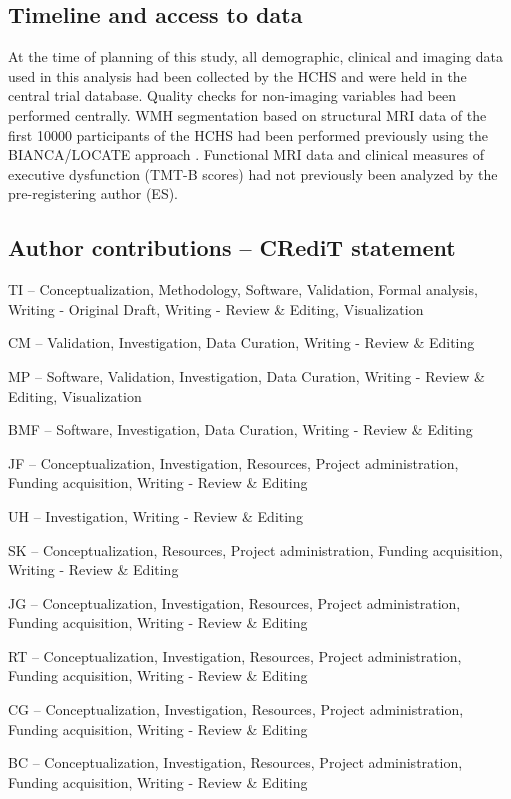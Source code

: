 \subsection{Timeline and access to data}
At the time of planning of this study, all demographic, clinical and imaging data used in this analysis had been collected by the HCHS and were held in the central trial database.
Quality checks for non-imaging variables had been performed centrally.
WMH segmentation based on structural MRI data of the first \num{10000} participants of the HCHS had been performed previously using the BIANCA/LOCATE approach \citep{Rimmele2022-bz}.
Functional MRI data and clinical measures of executive dysfunction (TMT-B scores) had not previously been analyzed by the pre-registering author (ES).

\subsection{Author contributions -- CRediT statement}
TI -- Conceptualization, Methodology, Software, Validation, Formal analysis, Writing - Original Draft, Writing - Review \& Editing, Visualization

CM -- Validation, Investigation, Data Curation, Writing - Review \& Editing

MP -- Software, Validation, Investigation, Data Curation, Writing - Review \& Editing, Visualization

BMF -- Software, Investigation, Data Curation, Writing - Review \& Editing

JF -- Conceptualization, Investigation, Resources, Project administration, Funding acquisition, Writing - Review \& Editing

UH -- Investigation, Writing - Review \& Editing

SK -- Conceptualization, Resources, Project administration, Funding acquisition, Writing - Review \& Editing

JG -- Conceptualization, Investigation, Resources, Project administration, Funding acquisition, Writing - Review \& Editing

RT -- Conceptualization, Investigation, Resources, Project administration, Funding acquisition, Writing - Review \& Editing

CG -- Conceptualization, Investigation, Resources, Project administration, Funding acquisition, Writing - Review \& Editing

BC -- Conceptualization, Investigation, Resources, Project administration, Funding acquisition, Writing - Review \& Editing

